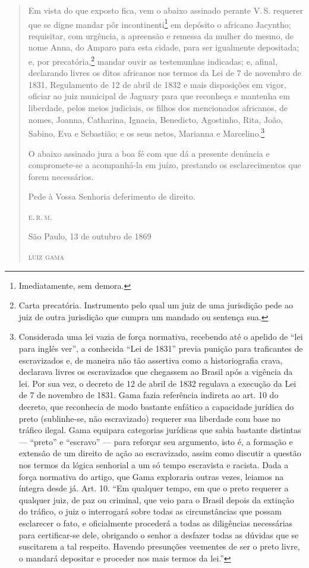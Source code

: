 \begin{quote}
Em vista do que exposto fica, vem o abaixo assinado perante V.\,S.
requerer que se digne mandar pôr incontinenti\footnote{Imediatamente,
  sem demora.} em depósito o africano Jacyntho; requisitar, com
urgência, a apreensão e remessa da mulher do mesmo, de nome Anna, do
Amparo para esta cidade, para ser igualmente depositada; e, por
precatória,\footnote{Carta precatória. Instrumento pelo qual um juiz de
  uma jurisdição pede ao juiz de outra jurisdição que cumpra um mandado
  ou sentença sua.} mandar ouvir as testemunhas indicadas; e, afinal,
declarando livres os ditos africanos nos termos da Lei de 7 de novembro
de 1831, Regulamento de 12 de abril de 1832 e mais disposições em vigor,
oficiar ao juiz municipal de Jaguary para que reconheça e mantenha em
liberdade, pelos meios judiciais, os filhos dos mencionados africanos,
de nomes, Joanna, Catharina, Ignacia, Benedicto, Agostinho, Rita, João,
Sabino, Eva e Sebastião; e os seus netos, Marianna e
Marcelino.\footnote{Considerada uma lei vazia de força normativa,
  recebendo até o apelido de ``lei para inglês ver'', a conhecida ``Lei de
  1831'' previa punição para traficantes de escravizados e, de maneira
  não tão assertiva como a historiografia crava, declarava livres os
  escravizados que chegassem ao Brasil após a vigência da lei. Por sua
  vez, o decreto de 12 de abril de 1832 regulava a execução da Lei de 7 de
  novembro de 1831. Gama fazia referência indireta ao art. 10 do
  decreto, que reconhecia de modo bastante enfático a capacidade
  jurídica do preto (sublinhe-se, não escravizado) requerer sua
  liberdade com base no tráfico ilegal. Gama equipara categorias
  jurídicas que sabia bastante distintas --- ``preto'' e ``escravo'' --- para
  reforçar seu argumento, isto é, a formação e extensão de um direito de
  ação ao escravizado, assim como discutir a questão nos termos da
  lógica senhorial a um só tempo escravista e racista. Dada a força
  normativa do artigo, que Gama exploraria outras vezes, leiamos na
  íntegra desde já. Art. 10. ``Em qualquer tempo, em que o preto requerer
  a qualquer juiz, de paz ou criminal, que veio para o Brasil depois da
  extinção do tráfico, o juiz o interrogará sobre todas as
  circunstâncias que possam esclarecer o fato, e oficialmente procederá
  a todas as diligências necessárias para certificar-se dele, obrigando
  o senhor a desfazer todas as dúvidas que se suscitarem a tal respeito.
  Havendo presunções veementes de ser o preto livre, o mandará depositar
  e proceder nos mais termos da lei.''\label{ingles}}

O abaixo assinado jura a boa fé com que dá a presente denúncia e
compromete-se a acompanhá-la em juízo, prestando os esclarecimentos que
forem necessários.

\begin{flushright}
Pede à Vossa Senhoria deferimento de direito.

\textsc{e.\,r.\,m.}

São Paulo, 13 de outubro de 1869

\textsc{luiz gama}
\end{flushright}
\end{quote}

